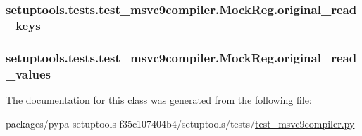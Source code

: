 \subsubsection[{original\+\_\+read\+\_\+keys}]{\setlength{\rightskip}{0pt plus 5cm}setuptools.\+tests.\+test\+\_\+msvc9compiler.\+Mock\+Reg.\+original\+\_\+read\+\_\+keys}\label{classsetuptools_1_1tests_1_1test__msvc9compiler_1_1MockReg_ae845a7f6150dce538ec194abdc75c882}
\hypertarget{classsetuptools_1_1tests_1_1test__msvc9compiler_1_1MockReg_a4b782f0bed883974e885d70d9a5bd48b}{}
\subsubsection[{original\+\_\+read\+\_\+values}]{\setlength{\rightskip}{0pt plus 5cm}setuptools.\+tests.\+test\+\_\+msvc9compiler.\+Mock\+Reg.\+original\+\_\+read\+\_\+values}\label{classsetuptools_1_1tests_1_1test__msvc9compiler_1_1MockReg_a4b782f0bed883974e885d70d9a5bd48b}


The documentation for this class was generated from the following file\+:\begin{DoxyCompactItemize}
\item 
packages/pypa-\/setuptools-\/f35c107404b4/setuptools/tests/\hyperlink{test__msvc9compiler_8py}{test\+\_\+msvc9compiler.\+py}\end{DoxyCompactItemize}

